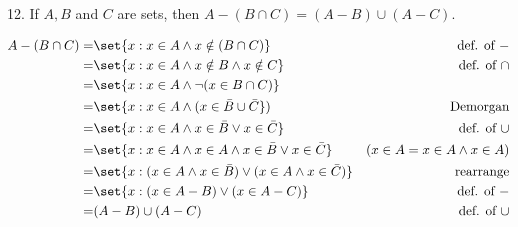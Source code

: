 \documentclass{hippoidC}
\begin{document}
\begin{prooflist}{12. If $A, B$ and $C$ are sets, then $A-(B \cap C)=(A-B) \cup(A-C)$.}
	\item
	\begin{align*}
		A-(B \cap C)= & \set{x: x\in A \land x\notin(B \cap C)}                              & \text{def. of }-                \\
		=             & \set{x: x\in A \land x\notin B \land x\notin C}                      & \text{def. of $\cap$}           \\
		=             & \set{x: x\in A \land \neg{(x\in B \cap C})}                          &                                 \\
		=             & \set{x: x\in A \land (x\in \bar{B} \cup \bar{C}})                    & \text{Demorgan}                 \\
		=             & \set{x: x\in A \land x\in \bar{B} \lor x\in\bar{C}}                  & \text{def. of }\cup             \\
		=             & \set{x: x\in A \land x\in A \land x\in \bar{B} \lor x\in\bar{C}}     & (x\in A = x\in A \land x \in A) \\
		=             & \set{x: (x\in A \land x\in \bar{B}) \lor (x\in A \land x\in\bar{C})} & \text{rearrange}                \\
		=             & \set{x: (x\in A  - B) \lor (x\in A - C)}                             & \text{def. of }-                \\
		=             & (A - B) \cup (A-C)                                                   & \text{def. of }\cup             \\
	\end{align*}
\end{prooflist}
\end{document}
